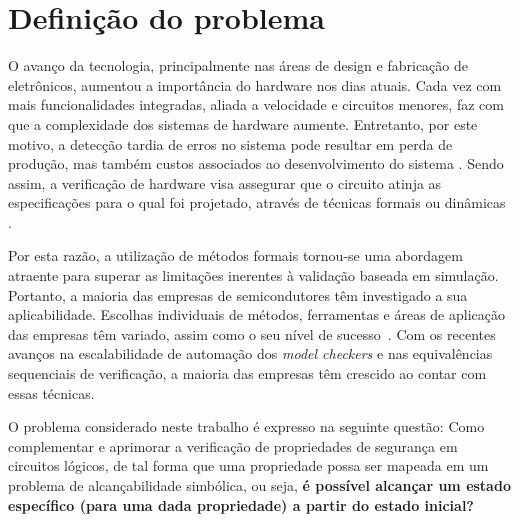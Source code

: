 \section{Definição do problema}

O avanço da tecnologia, principalmente nas áreas de design e fabricação de eletrônicos, aumentou a importância do hardware nos dias atuais. Cada vez com mais funcionalidades integradas, aliada a velocidade e circuitos menores, faz com que a complexidade dos sistemas de hardware aumente. Entretanto, por este motivo, a detecção tardia de erros no sistema pode resultar em perda de produção, mas também custos associados ao desenvolvimento do sistema \cite{gupta1992formal}. Sendo assim, a verificação de hardware visa assegurar que o circuito atinja as especificações para o qual foi projetado, através de técnicas formais ou dinâmicas \cite{boule2007efficient}.


Por esta razão, a utilização de métodos formais tornou-se uma abordagem atraente para superar as limitações inerentes à validação baseada em simulação. Portanto, a maioria das empresas de semicondutores têm investigado a sua aplicabilidade. Escolhas individuais de métodos, ferramentas e áreas de aplicação das empresas têm variado, assim como o seu nível de sucesso~\cite{cabodi2016hardware}. Com os recentes avanços na escalabilidade de automação dos \textit{model checkers} e nas equivalências sequenciais de verificação, a maioria das empresas têm crescido ao contar com essas técnicas\cite{clarke2008birth}.

O problema considerado neste trabalho é expresso na seguinte questão: Como complementar e aprimorar a verificação de propriedades de segurança em circuitos lógicos, de tal forma que uma propriedade possa ser mapeada em um problema de alcançabilidade simbólica, ou seja, \textbf{é possível alcançar um estado específico (para uma dada propriedade) a partir do estado inicial?}

